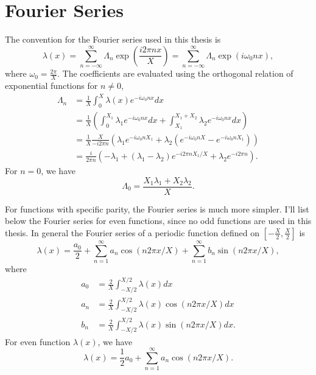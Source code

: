 \section{Fourier Series}

The convention for the Fourier series used in this thesis is
\begin{equation}
\lambda(x) = \sum_{n=-\infty}^{\infty} \Lambda_n \exp\left( \frac{i2\pi n x}{X} \right) = \sum_{n=-\infty}^{\infty} \Lambda_n \exp\left( i \omega_0 n x \right),
\end{equation}
where $\omega_0 = \frac{2\pi}{X}$. The coefficients are evaluated using the orthogonal relation of exponential functions for $n\neq 0$,
\begin{align}
   \Lambda_n &= \frac{1}{X} \int_0^X \lambda(x) e^{ - i \omega_0 n x} dx \\
   & = \frac{1}{X} \left( \int_{0}^{X_1} \lambda_1 e^{ - i \omega_0 n x} dx + \int_{X_1}^{X_1+X_2} \lambda_2 e^{ - i \omega_0 n x} dx  \right) \\
   & = \frac{1}{X} \frac{X}{-i2\pi n} \left( \lambda_1 e^{-i\omega_0 n X_1} + \lambda_2 \left( e^{-i\omega_0 n X} - e^{-i\omega_0 n X_1}  \right) \right) \\
   & = \frac{i}{2\pi n} \left( -\lambda_1 + (\lambda_1 - \lambda_2) e^{-i2\pi n X_1/X} + \lambda_2 e^{-i 2\pi n} \right).
   \label{app-chap:convention-sec:fourier-series-eqn:parametric-resonance-castle-wall-fourier-coeff}
\end{align}
For $n=0$, we have
\begin{equation}
   \Lambda_0 = \frac{X_1 \lambda_1 + X_2 \lambda_2}{X}. 
\end{equation}
   



For functions with specific parity, the Fourier series is much more simpler. I'll list below the Fourier series for even functions, since no odd functions are used in this thesis. In general the Fourier series of a periodic function defined on $\left[ -\frac{X}{2}, \frac{X}{2} \right]$ is
\begin{equation}
      \lambda(x) = \frac{a_0}{2} + \sum_{n=1}^\infty a_n \cos(n 2\pi x/X) + \sum_{n=1}^\infty b_n \sin(n 2\pi x/X),
\end{equation}
where
\begin{align}
    a_0 & = \frac{2}{X} \int^{X/2}_{-X/2} \lambda(x) d x \\
    a_n & = \frac{2}{X} \int_{-X/2}^{X/2} \lambda(x) \cos ( n2\pi x/X ) dx\\
    b_n & = \frac{2}{X} \int_{-X/2}^{X/2} \lambda(x) \sin( n 2\pi x/X ) dx.
\end{align}
For even function $\lambda(x)$, we have
\begin{equation}
      \lambda(x) = \frac{1}{2}a_0 + \sum_{n=1}^\infty a_n \cos (n 2\pi x/X).
\end{equation}

